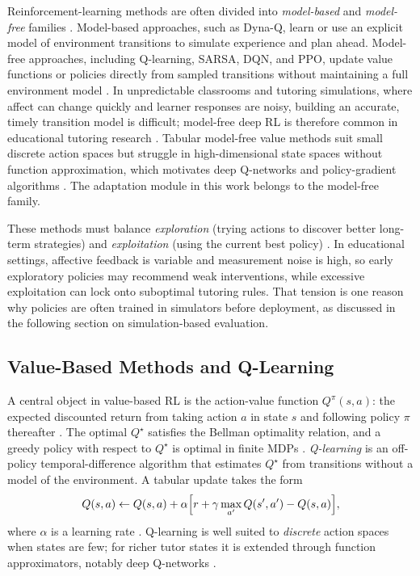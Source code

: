 Reinforcement-learning methods are often divided into \emph{model-based} and \emph{model-free} families \cite{sutton_rl_book_2018}. Model-based approaches, such as Dyna-Q, learn or use an explicit model of environment transitions to simulate experience and plan ahead. Model-free approaches, including Q-learning, SARSA, DQN, and PPO, update value functions or policies directly from sampled transitions without maintaining a full environment model \cite{sutton_rl_book_2018,mnih_dqn_2015,guzman_developing_2025}. In unpredictable classrooms and tutoring simulations, where affect can change quickly and learner responses are noisy, building an accurate, timely transition model is difficult; model-free deep RL is therefore common in educational tutoring research \cite{axak_adaptive_nodate,azoulay_adaptive_2021,guzman_developing_2025}. Tabular model-free value methods suit small discrete action spaces but struggle in high-dimensional state spaces without function approximation, which motivates deep Q-networks and policy-gradient algorithms \cite{sutton_rl_book_2018,mnih_dqn_2015}. The adaptation module in this work belongs to the model-free family.

These methods must balance \emph{exploration} (trying actions to discover better long-term strategies) and \emph{exploitation} (using the current best policy) \cite{sutton_rl_book_2018}. In educational settings, affective feedback is variable and measurement noise is high, so early exploratory policies may recommend weak interventions, while excessive exploitation can lock onto suboptimal tutoring rules. That tension is one reason why policies are often trained in simulators before deployment, as discussed in the following section on simulation-based evaluation.

\subsection{Value-Based Methods and Q-Learning}\label{sec:bg:qlearning}

A central object in value-based RL is the action-value function $Q^{\pi}(s,a)$: the expected discounted return from taking action $a$ in state $s$ and following policy $\pi$ thereafter \cite{sutton_rl_book_2018}. The optimal $Q^{\star}$ satisfies the Bellman optimality relation, and a greedy policy with respect to $Q^{\star}$ is optimal in finite MDPs \cite{sutton_rl_book_2018}. \emph{Q-learning} is an off-policy temporal-difference algorithm that estimates $Q^{\star}$ from transitions without a model of the environment. A tabular update takes the form
\begin{equation}
  Q(s,a) \leftarrow Q(s,a) + \alpha \Bigl[ r + \gamma \max_{a'} Q(s',a') - Q(s,a) \Bigr],
  \label{eq:q-learning}
\end{equation}
where $\alpha$ is a learning rate \cite{sutton_rl_book_2018}. Q-learning is well suited to \emph{discrete} action spaces when states are few; for richer tutor states it is extended through function approximators, notably deep Q-networks \cite{sutton_rl_book_2018,mnih_dqn_2015}.

